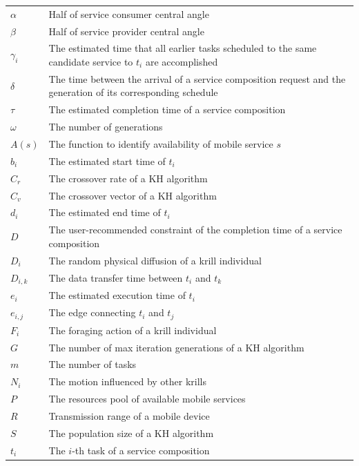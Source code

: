 \documentclass[journal]{IEEEtran}
\begin{document}
\noindent
\begin{tabular}{@{} l p{7.36cm} }
$\alpha$      &   Half of service consumer central angle \\
$\beta$       &   Half of service provider central angle \\
$\gamma_{i}$  &   The estimated time that all earlier tasks scheduled to the same candidate service to $t_i$ are accomplished  \\
$\delta$      &   The time between the arrival of a service composition request and the generation of its corresponding schedule \\
$\tau$        &   The estimated completion time of a service composition \\
$\omega$      &   The number of generations \\
$A(s)$        &   The function to identify availability of mobile service $s$ \\
$b_i$         &   The estimated start time of $t_i$ \\
$C_{r}$       &   The crossover rate of a KH algorithm \\
$C_{v}$       &   The crossover vector of a KH algorithm \\

$d_i$         &   The estimated end time of $t_i$ \\
$D$           &   The user-recommended constraint of the completion time of a service composition \\
$D_i$         &   The random physical diffusion of a krill individual \\
$D_{i,k}$     &   The data transfer time between $t_i$ and $t_k$ \\
$e_i$         &   The estimated execution time of $t_i$ \\
$e_{i,j}$     &   The edge connecting $t_i$ and $t_j$ \\
$F_i$         &   The foraging action of a krill individual \\ 
$G$           &   The number of max iteration generations of a KH algorithm \\
$m$           &   The number of tasks \\
$N_i$         &   The motion influenced by other krills \\
$P$           &   The resources pool of available mobile services \\
$R$           &   Transmission range of a mobile device \\
$S$           &   The population size of a KH algorithm \\
$t_i$         &   The $i$-th task of a service composition \\
\end{tabular}
\end{document}
